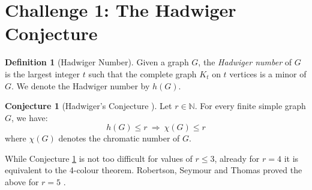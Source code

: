 \documentclass[12pt]{article}
\numberwithin{equation}{section}
\theoremstyle{definition}
\newtheorem{definition}{Definition}
\newtheorem{conjecture}[theorem]{Conjecture}
\newcommand{\ev}[1]{( #1 )}
\begin{document}
\section*{Challenge 1: The Hadwiger Conjecture}


\begin{definition}[Hadwiger Number]
Given a graph $G$, the \textit{Hadwiger number} of $G$ is the largest integer $t$ such that the complete graph $K_t$ on $t$ vertices is a minor of $G$.
We denote the Hadwiger number by $h\ev{G}$.
\end{definition}

\begin{conjecture}[Hadwiger's Conjecture
\mbox{\cite[Conjecture 1]{steiner}}]\label{hadw}
Let $r\in \mathbb{N}$.
For every finite simple graph $G$, we have:
$$
h\ev{G} \leq r \ \Longrightarrow \ \chi\ev{G} \leq r
$$
where $\chi\ev{G}$ denotes the chromatic number of $G$. 
\end{conjecture}

While Conjecture \ref{hadw} is not too difficult for values of $r\leq 3$, already for $r=4$ it is equivalent to the 4-colour theorem. 
Robertson, Seymour and Thomas proved the above for $r= 5$ \cite{RobertsonSeymourThomas1993Hadwiger}. 

\printbibliography
\end{document}
